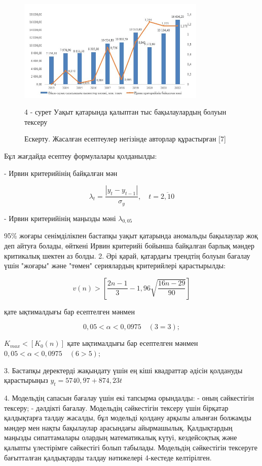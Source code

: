 \begin{figure}[H]
	\centering
	\includegraphics[width=0.8\textwidth]{media/ekon/image6.4}
	\caption*{4 - сурет Уақыт қатарында қалыптан тыс бақылаулардың болуын
  тексеру}
  \caption*{Ескерту. Жасалған есептеулер негізінде авторлар құрастырған {[}7{]}}
\end{figure}

\begin{multicols}{2}

Бұл жағдайда есептеу формулалары қолданылды:

- Ирвин критерийінің байқалған мән

\begin{equation*}
\lambda_t=\frac{|y_t-y_{t-1}|}{\sigma_y},\quad t=\overline{2, 10}
\end{equation*}

- Ирвин критерийінің маңызды мәні $\lambda_{0,05}$

95\% жоғары сенімділікпен бастапқы уақыт қатарында аномальды бақылаулар
жоқ деп айтуға болады, өйткені Ирвин критерийі бойынша байқалған барлық
мәндер критикалық шектен аз болды. 2. Әрі қарай, қатардағы трендтің
болуын бағалау үшін "жоғары" және "төмен" сериялардың критерийлері
қарастырылды:

\begin{equation*}
v(n)>[\frac{2n-1}{3}-1,96\sqrt{\frac{16n-29}{90}}]
\end{equation*}

қате ықтималдығы бар есептелген мәнмен

\begin{equation*}
0,05 < \alpha < 0,0975 \quad (3=3);
\end{equation*}

$K_{max}<[K_0(n)]$ қате ықтималдығы бар есептелген мәнмен
$0,05 < \alpha < 0,0975 \quad (6>5);$

3. Бастапқы деректерді жақындату үшін ең кіші квадраттар әдісін
қолдануды қарастырыңыз $y_t=5740,97+874,23t$

4. Модельдің сапасын бағалау үшін екі тапсырма орындалды: - оның
сәйкестігін тексеру; - дәлдікті бағалау. Модельдің сәйкестігін тексеру
үшін бірқатар қалдықтарға талдау жасалды, бұл модельді қолдану арқылы
алынған болжамды мәндер мен нақты бақылаулар арасындағы айырмашылық.
Қалдықтардың маңызды сипаттамалары олардың математикалық күтуі,
кездейсоқтық және қалыпты үлестірімге сәйкестігі болып табылады.
Модельдің сәйкестігін тексеруге бағытталған қалдықтарды талдау
нәтижелері 4-кестеде келтірілген.
\end{multicols}


